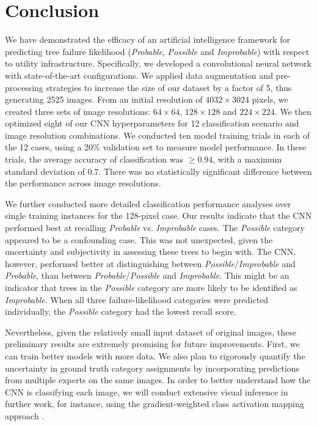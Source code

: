 \documentclass[Journal,letterpaper, SingleSpace, InsideFigs]{ascelike-new}
\begin{document}
\eject
\section{Conclusion}
We have demonstrated the efficacy of an artificial intelligence framework for predicting tree failure likelihood (\textit{Probable}, \textit{Possible} and \textit{Improbable}) with respect to utility infrastructure. Specifically, we developed a convolutional neural network with state-of-the-art configurations.
We applied data augmentation and pre-processing strategies to increase the size of our dataset by a factor of 5, thus generating 2525 images.
From an initial resolution of $4032 \times 3024$ pixels, we created three sets of image resolutions: $64 \times 64$, $128 \times 128$ and $224 \times 224$.
We then optimized eight of our CNN hyperparameters for 12  classification scenario and image resolution combinations. 
We conducted ten model training trials in each of the 12 cases, using a 20\% validation set to measure model performance.
In these trials, the average accuracy of classification was $\geq 0.94$, with a maximum standard deviation of 0.7.
There was no statistically significant difference between the performance across image resolutions.

We further conducted more detailed classification performance analyses over single training instances for the 128-pixel case.
Our results indicate that the CNN performed best at recalling \textit{Probable} vs. \textit{Improbable} cases.
The \textit{Possible} category appeared to be a confounding case.
This was not unexpected, given the uncertainty and subjectivity in assessing these trees to begin with.
The CNN, however, performed better at distinguishing between \textit{Possible}/\textit{Improbable} and \textit{Probable}, than between \textit{Probable}/\textit{Possible} and \textit{Improbable}.
This might be an indicator that trees in the \textit{Possible} category are more likely to be identified as \textit{Improbable}.
When all three failure-likelihood categories were predicted individually, the \textit{Possible} category had the lowest recall score.

Nevertheless, given the relatively small input dataset of original images, these preliminary results are extremely promising for future improvements.
First, we can train better models with more data.
We also plan to rigorously quantify the uncertainty in ground truth category assignments by incorporating predictions from multiple experts on the same images.
In order to better understand how the CNN is classifying each image, we will conduct extensive visual inference in further work, for instance, using the gradient-weighted class activation mapping approach \cite{zeiler2014visualizing}.
\end{document}
